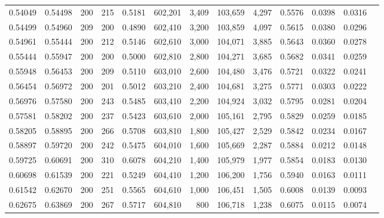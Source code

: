 \begin{tabular}{rrrrrrrrrrrrr}
0.54049 & 0.54498 &   200 & 215 &                                     0.5181 & 602,201 &   3,409 & 103,659 &   4,297 & 0.5576 & 0.0398 & 0.0316 \\
0.54499 & 0.54960 &   209 & 200 &                                     0.4890 & 602,410 &   3,200 & 103,859 &   4,097 & 0.5615 & 0.0380 & 0.0296 \\
0.54961 & 0.55444 &   200 & 212 &                                     0.5146 & 602,610 &   3,000 & 104,071 &   3,885 & 0.5643 & 0.0360 & 0.0278 \\
0.55444 & 0.55947 &   200 & 200 &                                     0.5000 & 602,810 &   2,800 & 104,271 &   3,685 & 0.5682 & 0.0341 & 0.0259 \\
0.55948 & 0.56453 &   200 & 209 &                                     0.5110 & 603,010 &   2,600 & 104,480 &   3,476 & 0.5721 & 0.0322 & 0.0241 \\
0.56454 & 0.56972 &   200 & 201 &                                     0.5012 & 603,210 &   2,400 & 104,681 &   3,275 & 0.5771 & 0.0303 & 0.0222 \\
0.56976 & 0.57580 &   200 & 243 &                                     0.5485 & 603,410 &   2,200 & 104,924 &   3,032 & 0.5795 & 0.0281 & 0.0204 \\
0.57581 & 0.58202 &   200 & 237 &                                     0.5423 & 603,610 &   2,000 & 105,161 &   2,795 & 0.5829 & 0.0259 & 0.0185 \\
0.58205 & 0.58895 &   200 & 266 &                                     0.5708 & 603,810 &   1,800 & 105,427 &   2,529 & 0.5842 & 0.0234 & 0.0167 \\
0.58897 & 0.59720 &   200 & 242 &                                     0.5475 & 604,010 &   1,600 & 105,669 &   2,287 & 0.5884 & 0.0212 & 0.0148 \\
0.59725 & 0.60691 &   200 & 310 &                                     0.6078 & 604,210 &   1,400 & 105,979 &   1,977 & 0.5854 & 0.0183 & 0.0130 \\
0.60698 & 0.61539 &   200 & 221 &                                     0.5249 & 604,410 &   1,200 & 106,200 &   1,756 & 0.5940 & 0.0163 & 0.0111 \\
0.61542 & 0.62670 &   200 & 251 &                                     0.5565 & 604,610 &   1,000 & 106,451 &   1,505 & 0.6008 & 0.0139 & 0.0093 \\
0.62675 & 0.63869 &   200 & 267 &                                     0.5717 & 604,810 &     800 & 106,718 &   1,238 & 0.6075 & 0.0115 & 0.0074 \\

\end{tabular}
